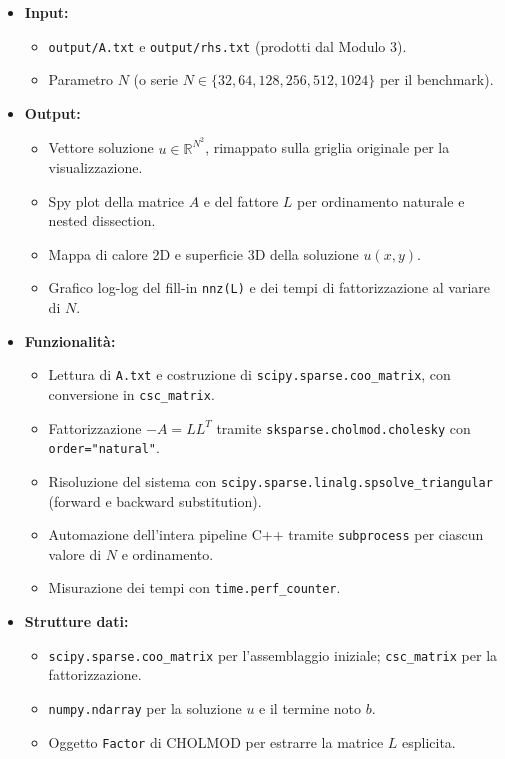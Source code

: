 \documentclass[a4paper,12pt]{article}
\begin{document}
\begin{itemize}
  \item \textbf{Input:}
    \begin{itemize}
      \item \texttt{output/A.txt} e \texttt{output/rhs.txt} (prodotti dal Modulo 3).
      \item Parametro $N$ (o serie $N \in \{32, 64, 128, 256, 512, 1024\}$ per il benchmark).
    \end{itemize}
  \item \textbf{Output:}
    \begin{itemize}
      \item Vettore soluzione $u \in \mathbb{R}^{N^2}$, rimappato sulla griglia originale per la visualizzazione.
      \item Spy plot della matrice $A$ e del fattore $L$ per ordinamento naturale e nested dissection.
      \item Mappa di calore 2D e superficie 3D della soluzione $u(x,y)$.
      \item Grafico log-log del fill-in \texttt{nnz(L)} e dei tempi di fattorizzazione al variare di $N$.
    \end{itemize}
  \item \textbf{Funzionalità:}
    \begin{itemize}
      \item Lettura di \texttt{A.txt} e costruzione di \texttt{scipy.sparse.coo\_matrix}, con conversione in \texttt{csc\_matrix}.
      \item Fattorizzazione $-A = LL^T$ tramite \texttt{sksparse.cholmod.cholesky} con \texttt{order="natural"}.
      \item Risoluzione del sistema con \texttt{scipy.sparse.linalg.spsolve\_triangular} (forward e backward substitution).
      \item Automazione dell'intera pipeline C++ tramite \texttt{subprocess} per ciascun valore di $N$ e ordinamento.
      \item Misurazione dei tempi con \texttt{time.perf\_counter}.
    \end{itemize}
  \item \textbf{Strutture dati:}
    \begin{itemize}
      \item \texttt{scipy.sparse.coo\_matrix} per l'assemblaggio iniziale; \texttt{csc\_matrix} per la fattorizzazione.
      \item \texttt{numpy.ndarray} per la soluzione $u$ e il termine noto $b$.
      \item Oggetto \texttt{Factor} di CHOLMOD per estrarre la matrice $L$ esplicita.

\end{itemize}
\end{itemize}
\end{document}
